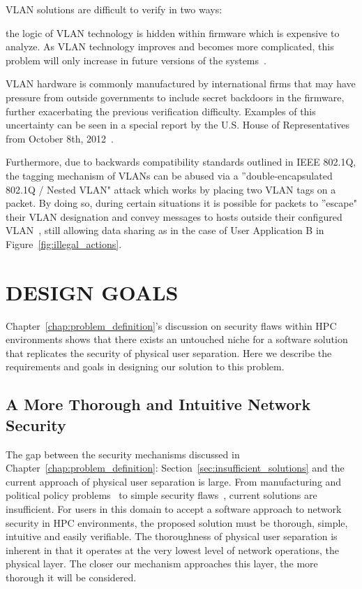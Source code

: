 \documentclass[oneside,12pt]{memoir}
\begin{document}
VLAN solutions are difficult to verify in two ways:
\begin{inparaenum} 
\item the logic of VLAN technology is hidden within firmware which is expensive to analyze. As VLAN technology improves and becomes more complicated, this problem will only increase in future versions of the systems~\cite{emery2011security}\cite{kloth2001derived}.
\item VLAN hardware is commonly manufactured by international firms that may have pressure from outside governments to include secret backdoors in the firmware, further exacerbating the previous verification difficulty. Examples of this uncertainty can be seen in a special report by the U.S. House of Representatives from October 8th, 2012~\cite{huawei}.
\end{inparaenum}

Furthermore, due to backwards compatibility standards outlined in IEEE 802.1Q, the tagging mechanism of VLANs can be abused via a ''double-encapsulated 802.1Q / Nested VLAN" attack which works by placing two VLAN tags on a packet. By doing so, during certain situations it is possible for packets to ''escape" their VLAN designation and convey messages to hosts outside their configured VLAN~\cite{cisco_vlan_whitepaper}, still allowing data sharing as in the case of User Application B in Figure~\ref{fig:illegal_actions}.

\chapter{DESIGN GOALS}
\label{chap:design_goals}
Chapter~\ref{chap:problem_definition}'s discussion on security flaws within HPC environments shows that there exists an untouched niche for a software solution that replicates the security of physical user separation. Here we describe the requirements and goals in designing our solution to this problem.
\section{A More Thorough and Intuitive Network Security}
The gap between the security mechanisms discussed in Chapter~\ref{chap:problem_definition}: Section~\ref{sec:insufficient_solutions} and the current approach of physical user separation is large. From manufacturing and political policy problems~\cite{huawei} to simple security flaws~\cite{cisco_vlan_whitepaper}, current solutions are insufficient. For users in this domain to accept a software approach to network security in HPC environments, the proposed solution must be thorough, simple, intuitive and easily verifiable. The thoroughness of physical user separation is inherent in that it operates at the very lowest level of network operations, the physical layer. The closer our mechanism approaches this layer, the more thorough it will be considered.
\end{document}
